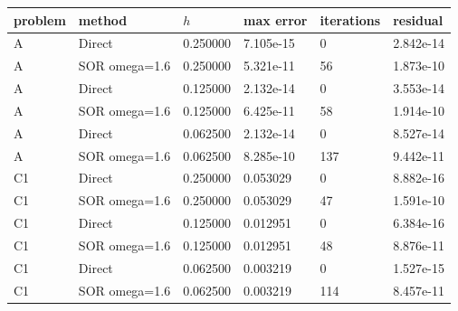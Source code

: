 \begin{tabular}{llllll}
\toprule
problem & method & $h$ & max error & iterations & residual \\
\midrule
A & Direct & 0.250000 & 7.105e-15 & 0 & 2.842e-14 \\
A & SOR omega=1.6 & 0.250000 & 5.321e-11 & 56 & 1.873e-10 \\
A & Direct & 0.125000 & 2.132e-14 & 0 & 3.553e-14 \\
A & SOR omega=1.6 & 0.125000 & 6.425e-11 & 58 & 1.914e-10 \\
A & Direct & 0.062500 & 2.132e-14 & 0 & 8.527e-14 \\
A & SOR omega=1.6 & 0.062500 & 8.285e-10 & 137 & 9.442e-11 \\
C1 & Direct & 0.250000 & 0.053029 & 0 & 8.882e-16 \\
C1 & SOR omega=1.6 & 0.250000 & 0.053029 & 47 & 1.591e-10 \\
C1 & Direct & 0.125000 & 0.012951 & 0 & 6.384e-16 \\
C1 & SOR omega=1.6 & 0.125000 & 0.012951 & 48 & 8.876e-11 \\
C1 & Direct & 0.062500 & 0.003219 & 0 & 1.527e-15 \\
C1 & SOR omega=1.6 & 0.062500 & 0.003219 & 114 & 8.457e-11 \\
\bottomrule
\end{tabular}
